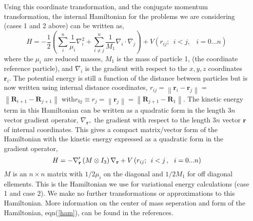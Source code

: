 \documentclass[12pt,thmsa]{article}
\begin{document}
Using this coordinate transformation, and the conjugate momentum
transformation, the internal Hamiltonian for the problems we are considering
(cases 1 and 2 above) can be written as, 
\begin{equation}
H=-\frac 12\left( \sum_i^n\frac 1{\mu _i}\nabla _i^2+\sum_{i\neq j}^n\frac
1{M_1}\nabla _i\cdot \nabla _j\right) +V\left(
r_{ij};\,\,\,i<j,\,\,\,\,\,i=0...n\right)  \label{intham1}
\end{equation}
where the $\mu _i$ are reduced masses, $M_1$ is the mass of particle 1, (the
coordinate reference particle), and $\nabla _i$ is the gradient with respect
to the $x,y,z$ coordinates $\mathbf{r}_i$. The potential energy is still a
function of the distance between particles but is now written using internal
distance coordinates, $r_{ij}=\left\| \mathbf{r}_i-\mathbf{r}_j\right\| =$ $%
\left\| \mathbf{R}_{i+1}-\mathbf{R}_{j+1}\right\| \,\,$with\thinspace $%
r_{0j}\equiv r_j=\left\| \mathbf{r}_j\right\| =\left\| \mathbf{R}_{j+1}-%
\mathbf{R}_1\right\| .$ The kinetic energy term in this Hamiltonian can be
written as a quadratic form in the length $3n$ vector gradient operator, $%
\nabla _{\mathbf{r}},$ the gradient with respect to the length $3n$ vector $%
\mathbf{r}$ of internal coordinates. This gives a compact matrix/vector form
of the Hamiltonian with the kinetic energy expressed as a quadratic form in
the gradient operator, 
\begin{equation}
H=-\nabla _{\mathbf{r}}^{\prime }\left( M\otimes I_3\right) \nabla _{\mathbf{%
r}}+V\left( r_{ij};\,\,\,i<j\,,\,\,\,\,i=0...n\right)  \label{ham}
\end{equation}
$M$ is an $n\times n$ matrix with $1/2\mu _i$ on the diagonal and $1/2M_1$
for off diagonal ellements. This is the Hamiltonian we use for variational
energy calculations (case 1 and case 2). We make no further transformations
or approximations to this Hamiltonian. More information on the center of
mass seperation and form of the Hamiltonian, eqn(\ref{ham}), can be found in
the references\cite{Kinghorn93,Kinghorn95b}.
\end{document}
